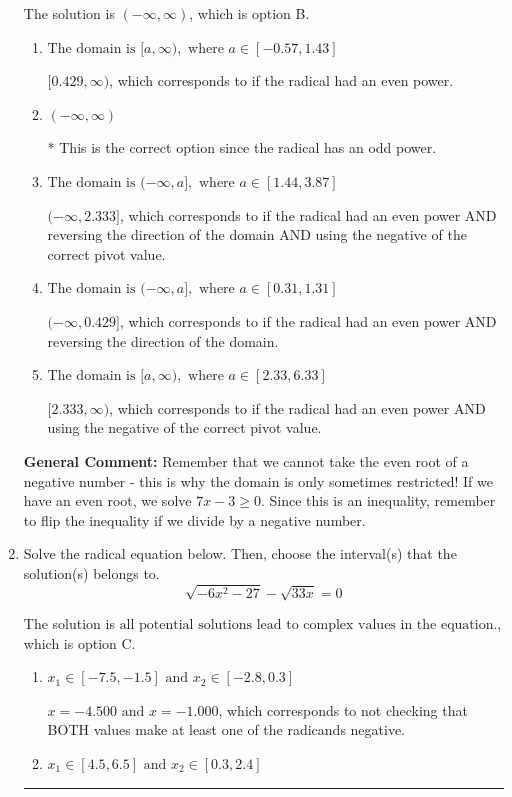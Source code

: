 \documentclass{extbook}[14pt]
\newcommand{\litem}[1]{\item #1

\rule{\textwidth}{0.4pt}}
\begin{document}
\begin{enumerate}
{The solution is \( (-\infty, \infty) \), which is option B.\begin{enumerate}[label=\Alph*.]
\item \( \text{The domain is } [a, \infty), \text{   where } a \in [-0.57, 1.43] \)

$[0.429, \infty)$, which corresponds to if the radical had an even power.
\item \( (-\infty, \infty) \)

* This is the correct option since the radical has an odd power.
\item \( \text{The domain is } (-\infty, a], \text{   where } a \in [1.44, 3.87] \)

$(-\infty, 2.333]$, which corresponds to if the radical had an even power AND reversing the direction of the domain AND using the negative of the correct pivot value.
\item \( \text{The domain is } (-\infty, a], \text{   where } a \in [0.31, 1.31] \)

$(-\infty, 0.429]$, which corresponds to if the radical had an even power AND reversing the direction of the domain.
\item \( \text{The domain is } [a, \infty), \text{   where } a \in [2.33, 6.33] \)

$[2.333, \infty)$, which corresponds to if the radical had an even power AND using the negative of the correct pivot value.
\end{enumerate}

\textbf{General Comment:} Remember that we cannot take the even root of a negative number - this is why the domain is only sometimes restricted! If we have an even root, we solve $7 x - 3 \geq 0$. Since this is an inequality, remember to flip the inequality if we divide by a negative number.
}
\litem{
Solve the radical equation below. Then, choose the interval(s) that the solution(s) belongs to.
\[ \sqrt{-6 x^2 - 27} - \sqrt{33 x} = 0 \]

The solution is \( \text{all potential solutions lead to complex values in the equation.} \), which is option C.\begin{enumerate}[label=\Alph*.]
\item \( x_1 \in [-7.5, -1.5] \text{ and } x_2 \in [-2.8,0.3] \)

$x = -4.500 \text{ and } x = -1.000$, which corresponds to not checking that BOTH values make at least one of the radicands negative.
\item \( x_1 \in [4.5, 6.5] \text{ and } x_2 \in [0.3,2.4] \)


\end{enumerate}}
\end{enumerate}
\end{document}
